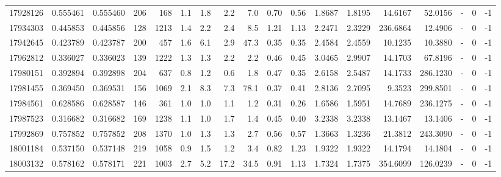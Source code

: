 \begin{tabular}{rrrrrrrrrrrrrrrlrr}
  17928126 & 0.555461 &   0.555460 &  206 &  168 &      1.1 &      1.8 &     2.2 &      7.0 &       0.70 &        0.56 &  1.8687 &  1.8195 &   14.6167 &   52.0156 &             - &        0 &         -1 \\
  17934303 & 0.445853 &   0.445856 &  128 & 1213 &      1.4 &      2.2 &     2.4 &      8.5 &       1.21 &        1.13 &  2.2471 &  2.3229 &  236.6864 &   12.4906 &             - &        0 &         -1 \\
  17942645 & 0.423789 &   0.423787 &  200 &  457 &      1.6 &      6.1 &     2.9 &     47.3 &       0.35 &        0.35 &  2.4584 &  2.4559 &   10.1235 &   10.3880 &             - &        0 &         -1 \\
  17962812 & 0.336027 &   0.336023 &  139 & 1222 &      1.3 &      1.3 &     2.2 &      2.2 &       0.46 &        0.45 &  3.0465 &  2.9907 &   14.1703 &   67.8196 &             - &        0 &         -1 \\
  17980151 & 0.392894 &   0.392898 &  204 &  637 &      0.8 &      1.2 &     0.6 &      1.8 &       0.47 &        0.35 &  2.6158 &  2.5487 &   14.1733 &  286.1230 &             - &        0 &         -1 \\
  17981455 & 0.369450 &   0.369531 &  156 & 1069 &      2.1 &      8.3 &     7.3 &     78.1 &       0.37 &        0.41 &  2.8136 &  2.7095 &    9.3523 &  299.8501 &             - &        0 &         -1 \\
  17984561 & 0.628586 &   0.628587 &  146 &  361 &      1.0 &      1.0 &     1.1 &      1.2 &       0.31 &        0.26 &  1.6586 &  1.5951 &   14.7689 &  236.1275 &             - &        0 &         -1 \\
  17987523 & 0.316682 &   0.316682 &  169 & 1238 &      1.1 &      1.0 &     1.7 &      1.4 &       0.45 &        0.40 &  3.2338 &  3.2338 &   13.1467 &   13.1406 &             - &        0 &         -1 \\
  17992869 & 0.757852 &   0.757852 &  208 & 1370 &      1.0 &      1.3 &     1.3 &      2.7 &       0.56 &        0.57 &  1.3663 &  1.3236 &   21.3812 &  243.3090 &             - &        0 &         -1 \\
  18001184 & 0.537150 &   0.537148 &  219 & 1058 &      0.9 &      1.5 &     1.2 &      3.4 &       0.82 &        1.23 &  1.9322 &  1.9322 &   14.1794 &   14.1804 &             - &        0 &         -1 \\
  18003132 & 0.578162 &   0.578171 &  221 & 1003 &      2.7 &      5.2 &    17.2 &     34.5 &       0.91 &        1.13 &  1.7324 &  1.7375 &  354.6099 &  126.0239 &             - &        0 &         -1 \\

\end{tabular}
